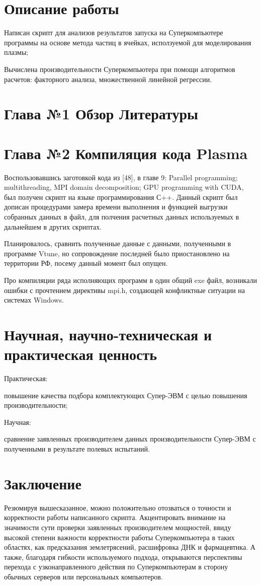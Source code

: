 \documentclass{article}
\begin{document}
\section{Описание работы}
Написан скрипт для анализов результатов запуска на Суперкомпьютере программы на основе метода частиц в ячейках, исползуемой для моделирования плазмы;

Вычислена производительности Суперкомпьютера при помощи алгоритмов расчетов: факторного анализа, множественной линейной регрессии.

\section{Глава №1 Обзор Литературы}

\section{Глава №2 Компиляция кода Plasma}
Воспользовавшись заготовкой кода из [48], в главе 9: Parallel programming; multithreading, MPI domain decomposition; GPU programming with CUDA, был получен скрипт на языке программирования С++. Данный скрипт был дописан процедурами замера времени выполнения и функцией выгрузки собранных данных в файл, для полчения расчетных данных используемых в дальнейшем в других скриптах.

Планировалось, сравнить полученные данные с данными, полученными в программе Vtune, но сопровождение последней было приостановлено на территории РФ, посему данный момент был опущен.

Про компиляции ряда исполняющих программ в один общий exe файл, возникали ошибки с прочтением директивы mpi.h, создающей конфликтные ситуации на системах Windows.

\section{Научная, научно-техническая и практическая ценность}
Практическая:

повышение качества подбора комплектующих Супер-ЭВМ с целью повышения производительности;

Научная:

сравнение заявленных производителем данных производительности Супер-ЭВМ с полученными в результате полевых испытаний.

\section{Заключение}
Резюмируя вышесказанное, можно положительно отозваться о точности и корректности работы написанного скрипта. Акцентировать внимание на значимости сути проверки заявленных производителем мощностей, ввиду высокой степени важности корректности работы Суперкомпьютера в таких областях, как предсказания землетрясений, расшифровка ДНК и фармацевтика. А также, благодаря гибкости используемого подхода, открываются перспективы перехода с узконаправленного действия по Суперкомпьютерам в сторону обычных серверов или персональных компьютеров.
\end{document}

